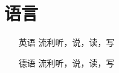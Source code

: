 \documentclass{res}
\begin{document}
\begin{CJK}{UTF8}{song}
\begin{resume}
\begin{itemize}
    \end{itemize}


    \section{语言}
    \begin{itemize}
    \item[{\CJKfamily{hei} 英语}] \hfill 流利听，说，读，写
    \item[{\CJKfamily{hei} 德语}]   \hfill 流利听，说，读，写
    \end{itemize}


\end{resume}
\end{CJK}
\end{document}
